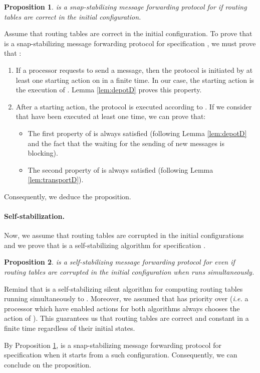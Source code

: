\documentclass[11pt]{article}
\newtheorem{proposition}{Proposition}
\newenvironment{proof}{{\noindent\bf Proof. } }{{\hfill }}
\begin{document}
\begin{proposition} \label{prop:snapTRD}
\AD is a snap-stabilizing message forwarding protocol for  if routing tables are correct in the initial configuration.
\end{proposition}

\begin{proof}
Assume that routing tables are correct in the initial configuration. To prove that \AD is a snap-stabilizing message forwarding protocol for specification , we must prove that :

\begin{enumerate}
\item If a processor  requests to send a message, then the protocol is initiated by at least one starting action on  in a finite time. In our case, the starting action is the execution of . Lemma \ref{lem:depotD} proves this property. 
\item After a starting action, the protocol is executed according to . If we consider that  have been executed at least one time, we can prove that:

\begin{itemize}
\item The first property of  is always satisfied (following Lemma \ref{lem:depotD} and the fact that the waiting for the sending of new messages is blocking). 
\item The second property of  is always satisfied (following Lemma \ref{lem:transportD}). 
\end{itemize}

\end{enumerate}

Consequently, we deduce the proposition.
\end{proof}

\paragraph{Self-stabilization.} Now, we assume that routing tables are corrupted in the initial configurations and we prove that \AD is a self-stabilizing algorithm for specification .

\begin{proposition} \label{prop:selfD}
\AD is a self-stabilizing message forwarding protocol for  even if routing tables are corrupted in the initial configuration when  runs simultaneously.
\end{proposition}

\begin{proof}
Remind that  is a self-stabilizing silent algorithm for computing routing tables running simultaneously to \AD. Moreover, we assumed that  has priority over \AD (\emph{i.e.} a processor which have enabled actions for both algorithms always chooses the action of ). This guarantees us that routing tables are correct and constant in a finite time regardless of their initial states. 

By Proposition \ref{prop:snapTRD}, \AD is a snap-stabilizing message forwarding protocol for specification  when it starts from a such configuration. Consequently, we can conclude on the proposition.
\end{proof}
\end{document}
